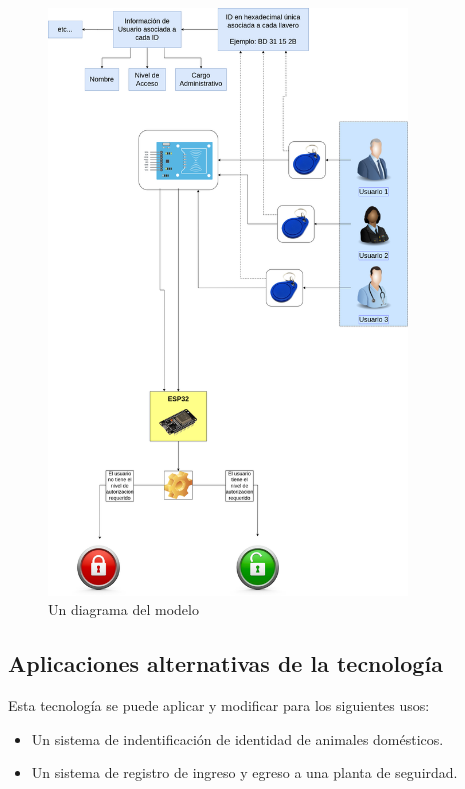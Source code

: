 \documentclass{article}
\begin{document}
\begin{figure}[H]
	\includegraphics[width=0.85\textwidth]{diagrama.drawio.png}
	\centering
	\caption{Un diagrama del modelo}
\end{figure}
\subsection{Aplicaciones alternativas de la tecnología}
Esta tecnología se puede aplicar y modificar para los siguientes usos:
\begin{itemize}
	\item Un sistema de indentificación de identidad de animales domésticos.
	\item Un sistema de registro de ingreso y egreso a una planta de seguirdad.
\end{itemize}
\end{document}
